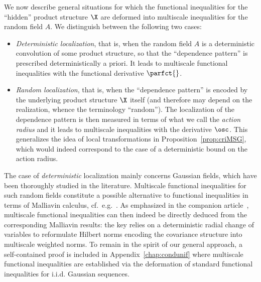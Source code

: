 We now describe general situations for which the functional inequalities for the ``hidden'' product structure $\X$ are deformed into multiscale inequalities for the random field $A$. We distinguish between the following two cases:
\begin{itemize}
\item \emph{Deterministic localization}, that is, when the random field $A$ is a deterministic convolution of some product structure, so that the ``dependence pattern'' is prescribed deterministically a priori. It leads to multiscale functional inequalities with the functional derivative $\parfct{}$.
\item \emph{Random localization}, that is, when the ``dependence pattern'' is encoded by the underlying product structure $\X$ itself (and therefore may depend on the realization, whence the terminology ``random''). The localization of the dependence pattern is then measured in terms of what we call the \emph{action radius} and it leads to multiscale inequalities with the derivative $\osc$. This generalizes the idea of local transformations in Proposition~\ref{prop:criMSG}, which would indeed correspond to the case of a deterministic bound on the action radius.
\end{itemize}

The case of \emph{deterministic} localization mainly concerns Gaussian fields, which have been thoroughly studied in the literature. Multiscale functional inequalities for such random fields constitute a possible alternative to functional inequalities in terms of Malliavin calculus, cf.~e.g.~\cite{Houdre-PerezAbreu-95,Nourdin-Peccati-12}. As emphasized in the companion article~\cite[Appendix~A]{DG3}, multiscale functional inequalities can then indeed be directly deduced from the corresponding Malliavin results: the key relies on a deterministic radial change of variables to reformulate Hilbert norms encoding the covariance structure into multiscale weighted norms. To remain in the spirit of our general approach, a self-contained proof is included in Appendix~\ref{chap:condunif} where multiscale functional inequalities are established via the deformation of standard functional inequalities for i.i.d. Gaussian sequences.


